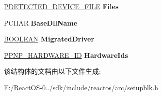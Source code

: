 \begin{DoxyCompactItemize}
\hyperlink{struct___d_e_t_e_c_t_e_d___d_e_v_i_c_e___f_i_l_e}{P\+D\+E\+T\+E\+C\+T\+E\+D\+\_\+\+D\+E\+V\+I\+C\+E\+\_\+\+F\+I\+LE} {\bfseries Files}
\item 
\mbox{\label{struct___d_e_t_e_c_t_e_d___d_e_v_i_c_e_ad51b36cab2d329439ad22666ec44dc8a}} 
P\+C\+H\+AR {\bfseries Base\+Dll\+Name}
\item 
\mbox{\label{struct___d_e_t_e_c_t_e_d___d_e_v_i_c_e_a867925bdfe417720c469aec8c6544182}} 
\hyperlink{_processor_bind_8h_a112e3146cb38b6ee95e64d85842e380a}{B\+O\+O\+L\+E\+AN} {\bfseries Migrated\+Driver}
\item 
\mbox{\label{struct___d_e_t_e_c_t_e_d___d_e_v_i_c_e_ae7f34542cd378700ecb93bf423c68558}} 
\hyperlink{struct___p_n_p___h_a_r_d_w_a_r_e___i_d}{P\+P\+N\+P\+\_\+\+H\+A\+R\+D\+W\+A\+R\+E\+\_\+\+ID} {\bfseries Hardware\+Ids}
\end{DoxyCompactItemize}


该结构体的文档由以下文件生成\+:\begin{DoxyCompactItemize}
\item 
E\+:/\+React\+O\+S-\/0../sdk/include/reactos/arc/setupblk.\+h\end{DoxyCompactItemize}
